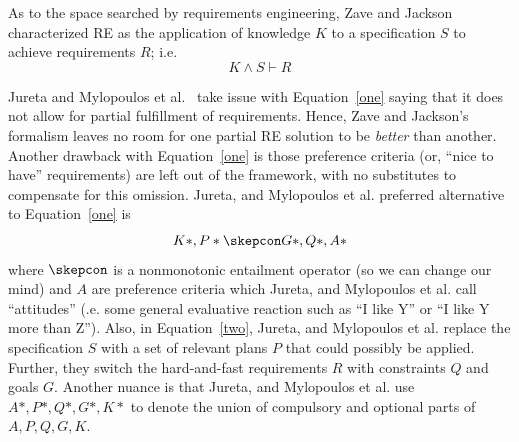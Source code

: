  
As to the  space searched by requirements engineering, Zave and Jackson~\cite{Zave97}   characterized RE as
the application of  knowledge  $K$ to a   specification $S$   to achieve 
requirements $R$; i.e.
\begin{equation}\label{one}
K \wedge S \vdash R\end{equation}

Jureta and Mylopoulos et al.~\cite{Jureta08} take issue with
 Equation~\ref{one} 
 saying that it does not allow for partial fulfillment of
requirements. Hence, Zave and Jackson's formalism    leaves no room for one 
partial RE
solution to be {\em better} than another.
Another drawback with Equation~\ref{one} is those   preference criteria
 (or, ``nice to have''
requirements) are left out of the framework, with no substitutes to compensate for this omission.
Jureta, and Mylopoulos et al. preferred alternative to Equation~\ref{one} is
\begin{equation}\label{two}K*,P* \skepcon G*,Q*,A*\end{equation}
where
$\skepcon$ is a nonmonotonic  entailment operator
   (so we can change our mind) and
$A$ are  preference criteria which  Jureta, and Mylopoulos et al.
call ``attitudes'' (.e. some   general evaluative
reaction such as ``I like Y'' or ``I like Y more than Z'').
Also, in Equation~\ref{two},
Jureta, and Mylopoulos et al. replace 
the specification $S$ with  a set of relevant
plans $P$ that could possibly be applied.
Further, they switch the hard-and-fast requirements $R$ with 
constraints $Q$ and  goals $G$. Another nuance is that Jureta, and Mylopoulos et al.
use  
$A*,P*,Q*,G*,K*$ to denote the union of  compulsory
and optional parts of $A,P,Q,G,K$. 



